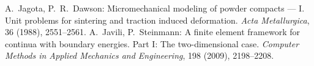 \documentclass[11pt,a4paper]{article}
\begin{document}
\begin{thebibliography}{99}
 A.~Jagota, P.~R.~Dawson: Micromechanical modeling of powder compacts --- I. Unit problems for sintering and traction induced deformation. \textit{Acta Metallurgica}, 36 (1988), 2551--2561. 
 A.~Javili, P.~Steinmann: A finite element framework for continua with boundary energies. Part I: The two-dimensional case. \textit{Computer Methods in Applied Mechanics and Engineering}, 198 (2009), 2198--2208.
\end{thebibliography}
\end{document}

